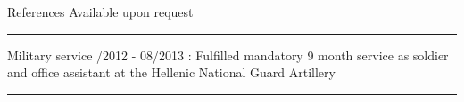 \documentclass[12pt]{resume}
\begin{document}
\begin{category}{References} 
\citemnobullet Available upon request

\noindent\rule{\textwidth}{0.2pt}
%
%
%    
%

    
%
%
%    
\end{category}

\begin{category}{Military service} 
/2012 - 08/2013 : Fulfilled mandatory 9 month service as soldier and office assistant at the Hellenic National Guard Artillery  

\noindent\rule{\textwidth}{0.2pt}
\end{category}
\end{document}
